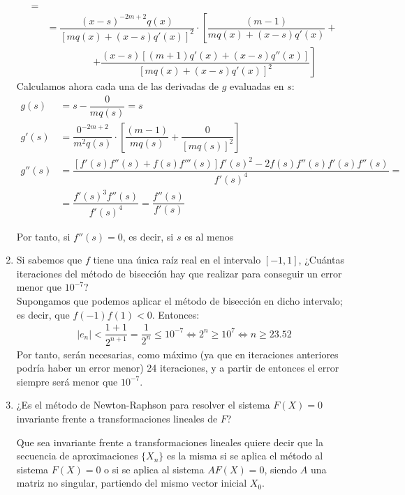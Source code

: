 \begin{ejercicio}
\begin{enumerate}
\begin{align*}
            =\\&= \dfrac{(x-s)^{-2m+2}q(x)}{[mq(x)+(x-s)q'(x)]^2}
            \cdot\left[ \dfrac{(m-1)}{mq(x)+(x-s)q'(x)}\right.
            +\\&\hspace{2cm}\left.+ \dfrac{(x-s)[(m+1)q'(x)+(x-s)q''(x)]}{[mq(x)+(x-s)q'(x)]^2}\right]
        \end{align*}
        Calculamos ahora cada una de las derivadas de $g$ evaluadas en $s$:
        \begin{align*}
            g(s) &= s-\dfrac{0}{mq(s)} = s\\
            g'(s) &= \dfrac{0^{-2m+2}}{m^2q(s)}
            \cdot\left[ \dfrac{(m-1)}{mq(s)}
            + \dfrac{0}{[mq(s)]^2}\right]
            \\
            g''(s) &= \dfrac{[f'(s)f''(s)+f(s)f'''(s)]f'(s)^2 - 2f(s)f''(s)f'(s)f''(s)}{f'(s)^4}
            =\\&= \dfrac{f'(s)^3f''(s)}{f'(s)^4} = \dfrac{f''(s)}{f'(s)}
        \end{align*}

        Por tanto, si $f''(s)=0$, es decir, si $s$ es al menos 
        \item Si sabemos que $f$ tiene una única raíz real en el intervalo $[-1, 1]$, ¿Cuántas iteraciones del método de bisección hay que realizar para conseguir un error menor que $10^{-7}$?\\
        
        Supongamos que podemos aplicar el método de bisección en dicho intervalo; es decir, que $f(-1)f(1)<0$. Entonces:
        \begin{align*}
            |e_n| < \dfrac{1+1}{2^{n+1}} = \dfrac{1}{2^n}\leq10^{-7}
            \iff 2^n\geq 10^7\iff n\geq 23.52
        \end{align*}
        Por tanto, serán necesarias, como máximo (ya que en iteraciones anteriores podría haber un error menor) 24 iteraciones, y a partir de entonces el error siempre será menor que $10^{-7}$.
        \item ¿Es el método de Newton-Raphson para resolver el sistema $F(X) = 0$ invariante frente a transformaciones lineales de $F$?
        \begin{observacion}
            Que sea invariante frente a transformaciones lineales quiere decir que la secuencia de aproximaciones $\{X_n\}$ es la misma si se aplica el método al sistema $F(X) = 0$ o si se aplica al sistema $AF(X) = 0$, siendo $A$ una matriz no singular, partiendo del mismo vector inicial $X_0$.
        \end{observacion}

    \end{enumerate}
\end{ejercicio}

